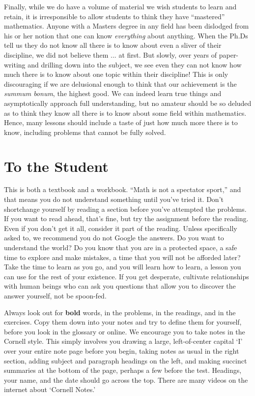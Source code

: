 Finally, while we do have a volume of material we wish students to learn and retain,
it is irresponsible to allow students to think they have ``mastered'' mathematics.  Anyone
with a Masters degree in any field has been dislodged from his or her notion that one
can know \emph{everything} about anything.  When the Ph.Ds tell us they do not know all
there is to know about even a sliver of their discipline, we did not believe them ... at first.
But slowly, over years of paper-writing and drilling down into the subject, we see even they
can not know how much there is to know about one topic within their discipline! This is
only discouraging if we are delusional enough to think that our achievement is the 
\textit{summum bonum}, the highest good.
We can indeed learn true things and asymptotically approach full understanding, but no
amateur should be so deluded as to think they know all there is to know about some
field within mathematics.  Hence, many lessons should include a taste of just how much
more there is to know, including problems that cannot be fully solved.


\section{To the Student}

This is both a textbook and a workbook.  ``Math is not a spectator sport,'' and that means
you do not understand something until you've tried it.  Don't shortchange yourself by reading a
section before you've attempted the problems.  If you want to read ahead, that's fine, but
try the assignment before the reading.  Even if you don't get it all, consider it part of the reading.
Unless specifically asked to, we recommend you do not Google the answers.
Do you want to understand
the world?  Do you know that you are in a protected space, a safe time to explore and 
make mistakes, a time that you will not be afforded later?  Take the time to learn as you go, 
and you will learn how to learn, a lesson you can use for the rest of your existence.  If you get
desperate, cultivate relationships with human beings who can ask you questions that
allow you to discover the answer yourself, not be spoon-fed.

Always look out for \textbf{bold} words, in the problems, in the readings, and in the exercises.
Copy them down into your notes and try to define them for yourself, before you look in the
glossary or online. We
encourage you to take notes in the Cornell style.  This simply involves you drawing a large,
left-of-center capital `I' over your entire note page before you begin, taking notes as usual
in the right section, adding subject and paragraph headings on the left, and making
succinct summaries at the bottom of the page, perhaps a few before the test.  Headings,
your name, and the date should go across the top.
There are many videos on the internet about `Cornell Notes.'

